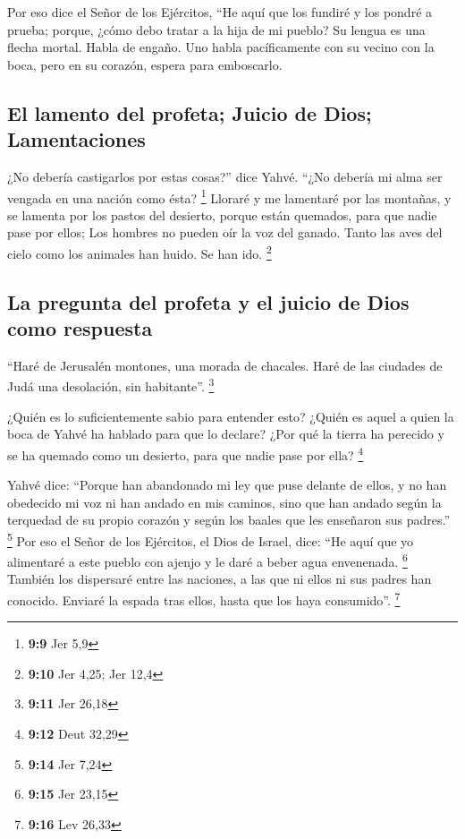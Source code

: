 \begin{paracol}{2}
 Por eso dice el Señor de los Ejércitos, ``He aquí que los
fundiré y los pondré a prueba; porque, ¿cómo debo tratar a la hija de mi
pueblo?  Su lengua es una flecha mortal. Habla de engaño.
Uno habla pacíficamente con su vecino con la boca, pero en su corazón,
espera para emboscarlo.

\hypertarget{el-lamento-del-profeta-juicio-de-dios-lamentaciones}{%
\subsection{El lamento del profeta; Juicio de Dios;
Lamentaciones}\label{el-lamento-del-profeta-juicio-de-dios-lamentaciones}}

 ¿No debería castigarlos por estas cosas?'' dice Yahvé.
``¿No debería mi alma ser vengada en una nación como ésta? \footnote{\textbf{9:9}
  Jer 5,9}  Lloraré y me lamentaré por las montañas, y se
lamenta por los pastos del desierto, porque están quemados, para que
nadie pase por ellos; Los hombres no pueden oír la voz del ganado. Tanto
las aves del cielo como los animales han huido. Se han ido. \footnote{\textbf{9:10}
  Jer 4,25; Jer 12,4}

\hypertarget{la-pregunta-del-profeta-y-el-juicio-de-dios-como-respuesta}{%
\subsection{La pregunta del profeta y el juicio de Dios como
respuesta}\label{la-pregunta-del-profeta-y-el-juicio-de-dios-como-respuesta}}

 ``Haré de Jerusalén montones, una morada de chacales.
Haré de las ciudades de Judá una desolación, sin habitante''.
\footnote{\textbf{9:11} Jer 26,18}

 ¿Quién es lo suficientemente sabio para entender esto?
¿Quién es aquel a quien la boca de Yahvé ha hablado para que lo declare?
¿Por qué la tierra ha perecido y se ha quemado como un desierto, para
que nadie pase por ella? \footnote{\textbf{9:12} Deut 32,29}

 Yahvé dice: ``Porque han abandonado mi ley que puse
delante de ellos, y no han obedecido mi voz ni han andado en mis
caminos,  sino que han andado según la terquedad de su
propio corazón y según los baales que les enseñaron sus padres.''
\footnote{\textbf{9:14} Jer 7,24}  Por eso el Señor de
los Ejércitos, el Dios de Israel, dice: ``He aquí que yo alimentaré a
este pueblo con ajenjo y le daré a beber agua envenenada. \footnote{\textbf{9:15}
  Jer 23,15}  También los dispersaré entre las naciones,
a las que ni ellos ni sus padres han conocido. Enviaré la espada tras
ellos, hasta que los haya consumido''. \footnote{\textbf{9:16} Lev 26,33}


\end{paracol}
